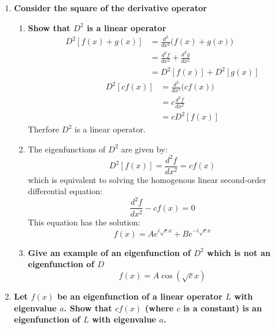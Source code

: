 \documentclass[9pt]{report}
\begin{document}
\begin{enumerate}
      \item \textbf{Consider the square of the derivative operator}
        \begin{enumerate}
          \item
            \textbf{Show that $D^2$ is a linear operator}
            \[
              \begin{align}
                D^2[f(x) + g(x)] &= \frac{d^2}{dx^2} \Big( f(x) + g(x) \Big)\\
                                 &= \frac{d^2f}{dx^2} + \frac{d^2g}{dx^2}\\
                                 &= D^2[f(x)] + D^2[g(x)]
              \end{align}
            \]
            \[
              \begin{align}
                D^2[cf(x)] &= \frac{d^2}{dx^2}\Big( cf(x)\Big) \\
                           &= c \frac{d^2f}{dx^2}\\
                           &= c D^2[f(x)]
              \end{align}
            \]
            Therfore $D^2$ is a linear operator.
          \item
            The eigenfunctions of $D^2$ are given by:
            \[
              D^2[f(x)] = \frac{d^2f}{dx^2} = cf(x)
            \]
            which is equivalent to solving the homogenous linear second-order
            differential equation:
            \[
              \frac{d^2f}{dx^2} - cf(x) =0
            \]
            This equation has the solution:
            \[
              f(x) = Ae^{i\sqrt{c}x} + Be^{-i\sqrt{c}x}
            \]
          \item
            \textbf{Give an example of an eigenfunction of $D^2$ which is not
            an eigenfunction of $D$}
            \[
              f(x) = A\cos(\sqrt{c} x)
            \]
        \end{enumerate}
      \item \textbf{Let $f(x)$ be an eigenfunction of a linear operator $L$ with
          eigenvalue $a$. Show that $cf(x)$ (where $c$ is a constant) is an
          eigenfunction of $L$ with eigenvalue $a$.}
  \end{enumerate}
\end{document}
